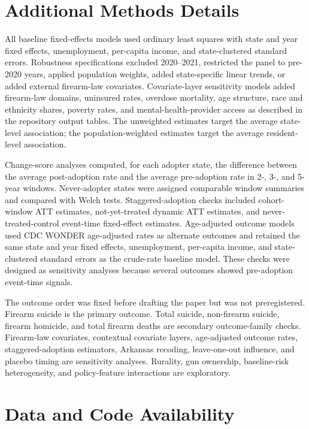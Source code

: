 \documentclass[11pt]{article}
\begin{document}
\section*{Additional Methods Details}

All baseline fixed-effects models used ordinary least squares with state and year fixed effects, unemployment, per-capita income, and state-clustered standard errors. Robustness specifications excluded 2020--2021, restricted the panel to pre-2020 years, applied population weights, added state-specific linear trends, or added external firearm-law covariates. Covariate-layer sensitivity models added firearm-law domains, uninsured rates, overdose mortality, age structure, race and ethnicity shares, poverty rates, and mental-health-provider access as described in the repository output tables. The unweighted estimates target the average state-level association; the population-weighted estimates target the average resident-level association.

Change-score analyses computed, for each adopter state, the difference between the average post-adoption rate and the average pre-adoption rate in 2-, 3-, and 5-year windows. Never-adopter states were assigned comparable window summaries and compared with Welch tests. Staggered-adoption checks included cohort-window ATT estimates, not-yet-treated dynamic ATT estimates, and never-treated-control event-time fixed-effect estimates. Age-adjusted outcome models used CDC WONDER age-adjusted rates as alternate outcomes and retained the same state and year fixed effects, unemployment, per-capita income, and state-clustered standard errors as the crude-rate baseline model. These checks were designed as sensitivity analyses because several outcomes showed pre-adoption event-time signals.

The outcome order was fixed before drafting the paper but was not preregistered. Firearm suicide is the primary outcome. Total suicide, non-firearm suicide, firearm homicide, and total firearm deaths are secondary outcome-family checks. Firearm-law covariates, contextual covariate layers, age-adjusted outcome rates, staggered-adoption estimators, Arkansas recoding, leave-one-out influence, and placebo timing are sensitivity analyses. Rurality, gun ownership, baseline-risk heterogeneity, and policy-feature interactions are exploratory.

\section*{Data and Code Availability}
\end{document}
